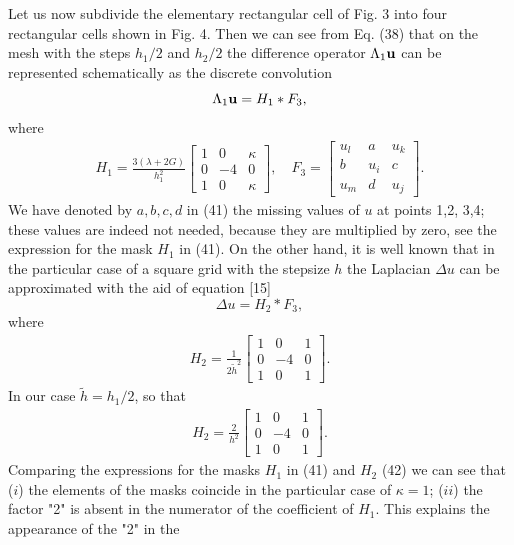 Let us now subdivide the elementary rectangular cell of Fig. 3 into four
rectangular cells shown in Fig. 4. Then we can see from Eq. (38) that on the
mesh with the steps $h_1/2$ and $h_2/2$ the difference operator $\Lambda_1{\bf
u}$ can be represented schematically as the discrete convolution
\begin{equation}
\Lambda_1{\bf u}=H_1*F_3,
\end{equation}
where
\begin{eqnarray}
H_1=\frac{3(\lambda+2G)}{h_1^2}\left [\begin{array}{ccc}
1   &  0  & \kappa\\
0   & -4  &   0   \\
1   &  0  & \kappa
\end{array}\right ], \quad
F_3=\left [\begin{array}{ccc}
u_l  &  a  &  u_k\\
b    &  u_i&  c  \\
u_m  &  d  &  u_j
\end{array} \right ].
\end{eqnarray}
We have denoted by $a,b,c,d$ in (41) the missing values of $u$ at points 1,2,
3,4; these values are indeed not needed, because they are multiplied by zero,
see the expression for the mask $H_1$ in (41). On the other hand, it is well
known that in the particular case of a square grid with the stepsize $h$ the
Laplacian $\Delta u$ can be approximated with the aid of equation [15]
$$\Delta u=H_2*F_3,$$
where
\begin{eqnarray*}
H_2=\frac{1}{2\tilde{h}^2}\left [\begin{array}{ccc}
1   &  0  & 1\\
0   & -4  &   0   \\
1   &  0  & 1
\end{array}\right ].
\end{eqnarray*}
In our case $\tilde{h}=h_1/2$, so that
\begin{eqnarray}
H_2=\frac{2}{h^2}\left [\begin{array}{ccc}
1   &  0  & 1\\
0   & -4  &   0   \\
1   &  0  & 1
\end{array}\right ].
\end{eqnarray}
Comparing the expressions for the masks $H_1$ in (41) and $H_2$ (42) we can see
that ($i$) the elements of the masks coincide in the particular case of
$\kappa=1$; ($ii$) the factor "2" is absent in the numerator of the
coefficient of $H_1$. This explains the appearance of the "2" in the
